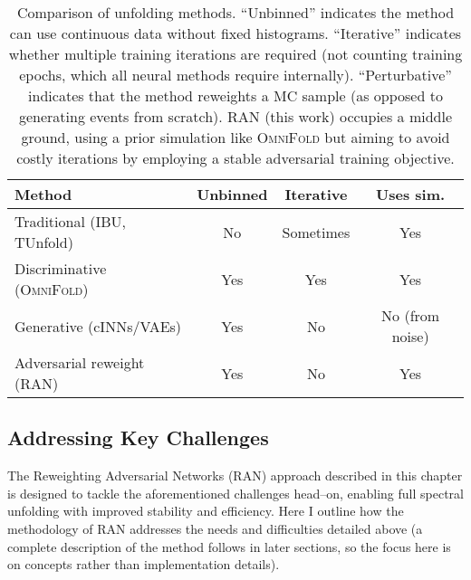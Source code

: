         \begin{table}
            \centering
            \caption{Comparison of unfolding methods. 
            “Unbinned” indicates the method can use continuous data without fixed histograms.
            “Iterative” indicates whether multiple training iterations are required (not counting training epochs, which all neural methods require internally).
            “Perturbative” indicates that the method reweights a MC sample (as opposed to generating events from scratch).
            RAN (this work) occupies a middle ground, using a prior simulation like \textsc{OmniFold} but aiming to avoid costly iterations by employing a stable adversarial training objective.}
            \label{tab:unfold_methods}
            \begin{tabular}{lccc}
                \toprule
                \textbf{Method} & \textbf{Unbinned} & \textbf{Iterative} & \textbf{Uses sim.} \\
                \midrule
                Traditional (IBU, TUnfold) & No & Sometimes & Yes\\
                Discriminative (\textsc{OmniFold})      & Yes & Yes & Yes \\
                Generative (cINNs/VAEs)             & Yes & No  & No (from noise)\\
                Adversarial reweight (RAN)        & Yes & No  & Yes \\
                \bottomrule
            \end{tabular}
        \end{table}

    \subsection{Addressing Key Challenges}
        The Reweighting Adversarial Networks (RAN) approach described in this chapter is designed to tackle the aforementioned challenges head--on, enabling full spectral unfolding with improved stability and efficiency.
        Here I outline how the methodology of RAN addresses the needs and difficulties detailed above (a complete description of the method follows in later sections, so the focus here is on concepts rather than implementation details).
        
